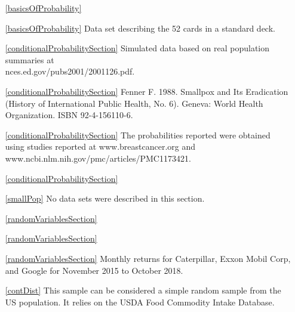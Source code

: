 \begin{itemize}
\setlength{\itemsep}{0mm}
\item[\ref{basicsOfProbability}]
\item[\ref{basicsOfProbability}]
    Data set describing the 52 cards in a standard deck.

\item[\ref{conditionalProbabilitySection}]
    Simulated data based on real population summaries at \\
        {nces.ed.gov/pubs2001/2001126.pdf}.
\item[\ref{conditionalProbabilitySection}]
    Fenner F. 1988.
    Smallpox and Its Eradication
    (History of International Public Health, No. 6).
    Geneva: World Health Organization. ISBN 92-4-156110-6.

\item[\ref{conditionalProbabilitySection}]
    The probabilities reported were obtained using studies
    reported at
        {www.breastcancer.org}
    and 
        {www.ncbi.nlm.nih.gov/pmc/articles/PMC1173421}. 

\item[\ref{conditionalProbabilitySection}]
    \madeup{}

\item[\ref{smallPop}]
    No data sets were described in this section.

\item[\ref{randomVariablesSection}]
    \madeup{}

\item[\ref{randomVariablesSection}]
    \madeup{}

\item[\ref{randomVariablesSection}]
    Monthly returns for Caterpillar, Exxon Mobil Corp,
    and Google for November 2015 to October 2018.

\item[\ref{contDist}]
    This sample can be considered a simple random sample
    from the US population.
    It relies on the USDA Food Commodity Intake Database.

\end{itemize}




